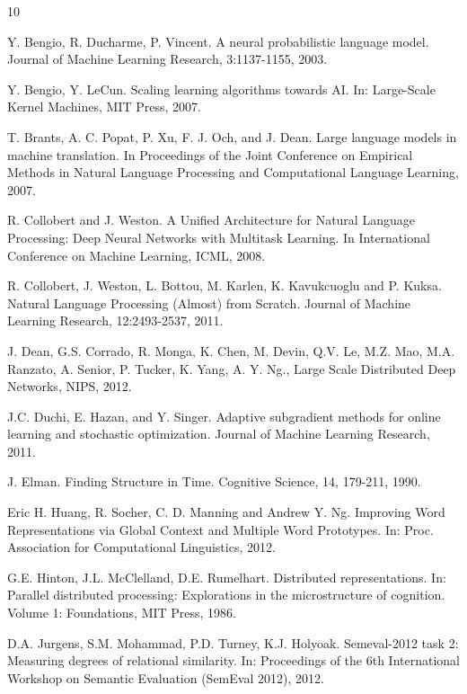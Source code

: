 \documentclass{article} %
\begin{document}
\begin{thebibliography}{10}

 Y. Bengio, R. Ducharme, P.
Vincent. A neural probabilistic language model. Journal of
Machine Learning Research, 3:1137-1155, 2003.

 Y. Bengio, Y. LeCun. Scaling learning algorithms towards
AI. In: Large-Scale Kernel Machines, MIT Press, 2007.

 T. Brants, A. C. Popat, P. Xu, F. J. Och, and J. Dean.
Large language models in machine translation. In
Proceedings of the Joint Conference on Empirical
Methods in Natural Language Processing and
Computational Language Learning, 2007.

 R. Collobert and J. Weston.
A Unified Architecture for Natural Language Processing: Deep Neural Networks with Multitask Learning.
In International Conference on Machine Learning, ICML, 2008.

 R. Collobert, J. Weston, L. Bottou, M. Karlen, K. Kavukcuoglu and P. Kuksa.
Natural Language Processing (Almost) from Scratch. Journal of Machine Learning Research, 12:2493-2537, 2011.

  J. Dean, G.S. Corrado, R. Monga, K. Chen, M.
Devin, Q.V. Le, M.Z. Mao, M.A. Ranzato, A. Senior, P. Tucker, K. Yang,
A. Y. Ng., Large Scale Distributed Deep Networks, NIPS, 2012.

 J.C. Duchi, E. Hazan, and Y. Singer. Adaptive
subgradient methods for online learning and stochastic optimization. Journal of Machine Learning Research, 2011.

 J. Elman. Finding Structure in Time. Cognitive Science, 14, 179-211, 1990.

 Eric H. Huang, R. Socher, C. D. Manning and Andrew Y. Ng. Improving Word Representations via Global Context and Multiple Word Prototypes.
In: Proc. Association for Computational Linguistics, 2012.

 G.E. Hinton, J.L. McClelland, D.E. Rumelhart. Distributed representations. In: Parallel distributed processing: Explorations in the microstructure of cognition. Volume 1: Foundations, MIT Press, 1986.

 D.A. Jurgens, S.M. Mohammad, P.D. Turney, K.J. Holyoak. Semeval-2012 task 2: Measuring degrees of relational similarity. In: Proceedings of the 6th International Workshop on Semantic Evaluation (SemEval 2012), 2012.


\end{thebibliography}
\end{document}
